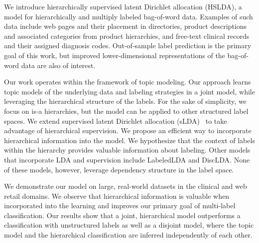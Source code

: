 

We introduce hierarchically supervised latent Dirichlet allocation (HSLDA), a
model for hierarchically and multiply labeled bag-of-word data.  Examples of
such data include web pages and their placement in directories, product
descriptions and associated categories from product hierarchies, and free-text
clinical records and their assigned diagnosis codes. Out-of-sample label
prediction is the primary goal of this work, but improved lower-dimensional
representations of the bag-of-word data are also of interest.

Our work operates within the framework of topic modeling. Our approach learns
topic models of the underlying data and labeling strategies in a joint model,
while leveraging the hierarchical structure of the labels. For the sake of
simplicity, we focus on is-a hierarchies, but the model can be
applied to other structured label spaces. We extend supervised latent Dirichlet
allocation (sLDA)~\cite{BleiMcAuliffe2008} to take advantage of hierarchical
supervision. We propose an efficient way to incorporate hierarchical
information into the model. We hypothesize that the context of labels within
the hierarchy provides valuable information about labeling. Other models that incorporate LDA and supervision include
LabeledLDA\citep{Ramage2009} and DiscLDA\citep{DiscLDA}. None of these models, however, leverage dependency structure in the label space.

We demonstrate our model on large, real-world datasets in the clinical and web
retail domains. We observe that hierarchical information is valuable when
incorporated into the learning and improves our primary goal of multi-label
classification. Our results show that a joint, hierarchical model outperforms a
classification with unstructured labels as well as a disjoint model, where the
topic model and the hierarchical classification are inferred
independently of each other. 


